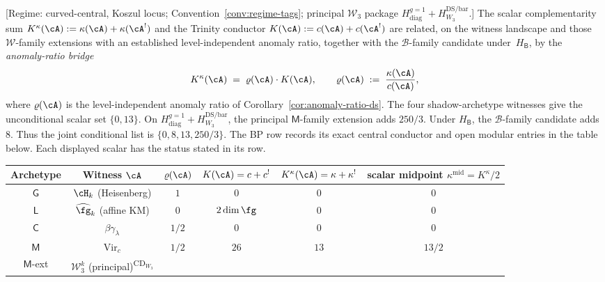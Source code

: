 \begin{proposition}
\label{prop:archetype-complementarity-bridge}
\textup{[Regime: curved-central, Koszul locus;
Convention~\textup{\ref{conv:regime-tags}};
principal $\mathcal W_3$ package
$H_{\mathrm{diag}}^{g=1}+H_{W_3}^{\mathrm{DS/bar}}$.]}
The scalar complementarity sum
$K^\kappa(\cA) := \kappa(\cA) + \kappa(\cA^!)$ and the Trinity
conductor $K(\cA) := c(\cA) + c(\cA^!)$ are related, on the witness
landscape and those $\mathcal{W}$-family extensions with an established
level-independent anomaly ratio, together with the $\mathcal B$-family
candidate under~$H_{\mathsf B}$, by the
\emph{anomaly-ratio bridge}
\begin{equation}\label{eq:kappa-sum-rho-K-bridge}
 K^\kappa(\cA) \;=\; \varrho(\cA) \cdot K(\cA),
 \qquad
 \varrho(\cA) \;:=\; \frac{\kappa(\cA)}{c(\cA)},
\end{equation}
where $\varrho(\cA)$ is the level-independent anomaly ratio of
Corollary~\ref{cor:anomaly-ratio-ds}.  The four shadow-archetype
witnesses give the unconditional scalar set $\{0,13\}$.  On
$H_{\mathrm{diag}}^{g=1}+H_{W_3}^{\mathrm{DS/bar}}$, the principal
$\mathsf{M}$-family extension adds $250/3$.  Under $H_{\mathsf B}$,
the $\mathcal B$-family candidate adds~$8$.  Thus the joint conditional
list is $\{0,8,13,250/3\}$.  The BP row
records its exact central conductor and open modular entries in the table
below.  Each displayed scalar has the status stated in its row.
\begin{center}
\renewcommand{\arraystretch}{1.35}
\begin{tabular}{|c|c|c|c|c|c|}
\hline
Archetype & Witness $\cA$ & $\varrho(\cA)$ & $K(\cA) = c + c^!$
 & $K^\kappa(\cA) = \kappa + \kappa^!$
 & scalar midpoint $\kappa^{\mathrm{mid}}=K^\kappa/2$ \\
\hline
$\mathsf{G}$ & $\cH_k$ (Heisenberg) & $1$ & $0$ & $0$ & $0$ \\
\hline
$\mathsf{L}$ & $\widehat{\fg}_k$ (affine KM) & $0$ & $2\dim\fg$ & $0$ & $0$ \\
\hline
$\mathsf{C}$ & $\beta\gamma_\lambda$ & $1/2$ & $0$ & $0$ & $0$\\
\hline
$\mathsf{M}$ & $\mathrm{Vir}_c$ & $1/2$ & $26$ & $13$ & $13/2$ \\
\hline
\hline
$\mathsf{M}$-ext & $\mathcal{W}_3^k$ (principal)\textsuperscript{$\mathrm{CD}_{W_3}$}

\end{tabular}
\end{center}
\end{proposition}
